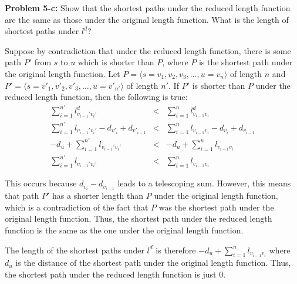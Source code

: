 \documentclass[psamsfonts]{amsart}
\newenvironment{sol}{\vspace{0.25cm}{\large \bfseries Solution:}}{\qedsymbol}
\newenvironment{prob}[1]{\begin{framed}{\large \bfseries Problem #1:}}{\end{framed}}
\begin{document}
\begin{prob}{5-c}
Show that the shortest paths under the reduced length function are the same as those under the original length function. What is the length of shortest paths under $l^d$?
\end{prob}
\begin{sol}
Suppose by contradiction that under the reduced length function, there is some path $P'$ from $s$ to $u$ which is shorter than $P$, where $P$ is the shortest path under the original length function. Let $P = \langle s=v_1, v_2, v_3, \ldots, u=v_n \rangle$ of length $n$ and $P' = \langle s=v'_1, v'_2, v'_3, \ldots, u = v'_{n'}\rangle$ of length $n'$. If $P'$ is shorter than $P$ under the reduced length function, then the following is true:
\begin{eqnarray}
\sum_{i=1}^{n'} l^d_{v_{i-1}' v_{i}'} &<& \sum_{i=1}^n l^d_{v_{i-1} v_i} \\
\sum_{i=1}^{n'} l_{v_{i-1}' v_{i}'} - d_{v'_i} + d_{v'_{i-1}} &<& \sum_{i=1}^{n} l_{v_{i-1} v_{i}} - d_{v_i} + d_{v_{i-1}} \\
-d_{u} + \sum_{i=1}^{n'} l_{v_{i-1}' v_i'} &<& -d_u + \sum_{i=1}^n l_{v_{i-1} v_i} \\
\sum_{i=1}^{n'} l_{v_{i-1}' v_i'} &<& \sum_{i=1}^n l_{v_{i-1} v_i} 
\end{eqnarray}

This occurs because $d_{v_i} - d_{v_{i-1}}$ leads to a telescoping sum. However, this means that path $P'$ has a shorter length than $P$ under the original length function, which is a contradiction of the fact that $P$ was the shortest path under the original length function. Thus, the shortest path under the reduced length function is the same as the one under the original length function.

The length of the shortest paths under $l^d$ is therefore $-d_u + \sum_{i=1}^n l_{v_{i-1} v_{i}}$ where $d_u$ is the distance of the shortest path under the original length function. Thus, the shortest path under the reduced length function is just 0. 
\end{sol}
\end{document}
